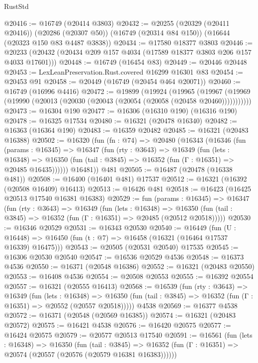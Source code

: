 \begin{lexlean}{RustStd}
\begin{coremodule}
@20416 := @16749 (@20414 @3803)
@20432 := @20255
    (@20329 (@20411 @20416))
    (@20286 (@20307 @50))
    (@16749 (@20314 @84 @150))
    (@16644 (@20323 @150 @83 @4487 @3838))
@20434 := @17580 @18377 @3803
@20446 := @20233 (@20432 (@20434 @209 @157 @4034 (@17589 @18377 @3803 @206 @157 @4033 @17601)))
@20448 := @16749 (@16454 @83)
@20449 := @20446 @20448
@20453 := LexLeanPreservation.Rust.covered @16299 @16301 @83
@20454 := @20453 @91
@20458 := @20449 (@16749 (@20454 @464 @20071))
@20460 := @16749 (@16996 @4416)
@20472 := @19899
    (@19924
      (@19965
        (@19967 (@19969 (@19990 (@20013 (@20030 (@20043 (@20054 (@20058 (@20458 @20460)))))))))))
@20473 := @16304 @190
@20477 := @16306 (@16310 @190) (@16316 @190)
@20478 := @16325 @17534
@20480 := @16321 (@20478 @16340)
@20482 := @16363 (@16364 @190)
@20483 := @16359 @20482
@20485 := @16321 (@20483 @16388)
@20502 := @16320
    (fun (fn : @74) =>
    @20480
      (@16343
        (@16346
          (fun (params : @16345) =>
          @16347
            (fun (rty : @3643) =>
            @16349
              (fun (lets : @16348) =>
              @16350 (fun (tail : @3845) => @16352 (fun (Γ : @16351) => @20485 @16435))))))
        @16481))
    @481
@20505 := @16487 (@20478 (@16338 @481))
@20508 := @16400 (@16401 @481) @17537
@20512 := @16321 (@16392 (@20508 @16409) @16413)
@20513 := @16426 @481
@20518 := @16423 (@16425 @20513 @17540 @16381 @16383)
@20529 := fun (params : @16345) =>
  @16347
    (fun (rty : @3643) =>
    @16349
      (fun (lets : @16348) =>
      @16350 (fun (tail : @3845) => @16352 (fun (Γ : @16351) => @20485 (@20512 @20518)))))
@20530 := @16346 @20529
@20531 := @16343 @20530
@20540 := @16449
    (fun (U : @16448) => @16450 (fun (t : @7) => @16458 (@16321 (@16464 @17537 @16339) @16475)))
@20543 := @20505 (@20531 @20540) @17535
@20545 := @16306 @20530 @20540
@20547 := @16536 @20529 @4536
@20548 := @16373 @4536
@20550 := @16371 (@20548 @16386)
@20552 := @16321 (@20483 @20550)
@20553 := @16408 @4536
@20554 := @20508 @20553
@20555 := @16392 @20554
@20557 := @16321 (@20555 @16413)
@20568 := @16539
    (fun (rty : @3643) =>
    @16349
      (fun (lets : @16348) =>
      @16350 (fun (tail : @3845) => @16352 (fun (Γ : @16351) => @20552 (@20557 @20518)))))
    @4538
@20569 := @16377 @4538
@20572 := @16371 (@20548 (@20569 @16385))
@20574 := @16321 (@20483 @20572)
@20575 := @16421 @4538
@20576 := @16420 @20575
@20577 := @16424 @20575
@20579 := @20577 @20513 @17540
@20591 := @16561
    (fun (lets : @16348) =>
    @16350
      (fun (tail : @3845) =>
      @16352 (fun (Γ : @16351) => @20574 (@20557 (@20576 (@20579 @16381 @16383))))))

\end{coremodule}
\end{lexlean}
